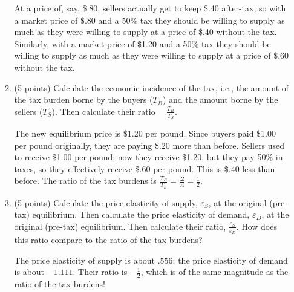 \documentclass{article}
\begin{document}
\begin{enumerate}
\begin{enumerate}
\begin{KEY} At a price of, say, \$.80, sellers actually get to keep \$.40 after-tax, so with a market price of \$.80 and a 50\% tax they should be willing to supply as much as they were willing to supply at a price of \$.40 without the tax. Similarly, with a market price of \$1.20 and a 50\% tax they should be willing to supply as much as they were willing to supply at a price of \$.60 without the tax. \end{KEY} 

\item \begin{EXAM} (5 points) Calculate the economic incidence of the tax, i.e., the amount of the tax burden borne by the buyers ($T_B$) and the amount borne by the sellers ($T_S$). Then calculate their ratio \ \ $\displaystyle \frac{T_B}{T_S}$. \vspace{1.6in} \end{EXAM} 

\begin{KEY} The new equilibrium price is \$1.20 per pound. Since buyers paid \$1.00 per pound originally, they are paying \$.20 more than before. Sellers used to receive \$1.00 per pound; now they receive \$1.20, but they pay 50\% in taxes, so they effectively receive \$.60 per pound. This is \$.40 less than before. The ratio of the tax burdens is $\frac{T_B}{T_S} = \frac{.2}{.4}=\frac{1}{2}.$
\end{KEY} 


\item \begin{EXAM} (5 points) Calculate the price elasticity of supply, $\varepsilon_S$, at the original
(pre-tax) equilibrium. Then calculate the price elasticity of demand, $\varepsilon_D$, at the original (pre-tax) equilibrium. Then calculate their ratio, $\displaystyle \frac{\varepsilon_S}{\varepsilon_D}$. How does this ratio compare to the ratio of the tax burdens? \vspace{3.6in}  \end{EXAM} 

\begin{KEY} The price elasticity of supply is about $.556$; the price elasticity of demand is about $-1.111$. Their ratio is $-\frac{1}{2}$, which is of the same magnitude as the ratio of the tax burdens! \end{KEY} 


\end{enumerate}


\begin{EXAM}


\end{EXAM}
\end{enumerate}
\end{document}
